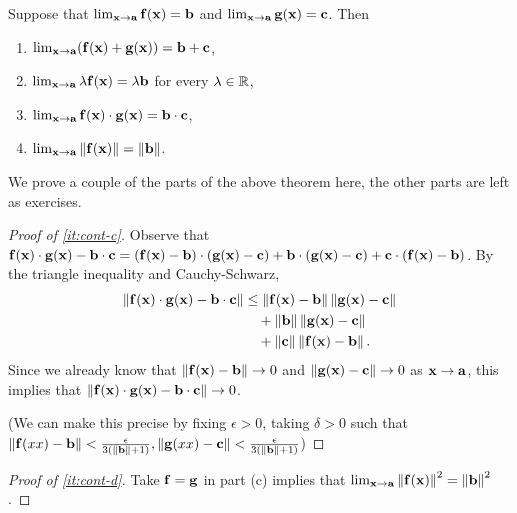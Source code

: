 \begin{theorem}
    Suppose that \(  \lim_{\mathbf{x} \to \mathbf{a}}\mathbf{f}(\mathbf{x}) = \mathbf{b}\) and \(  \lim_{\mathbf{x} \to \mathbf{a}}\mathbf{g}(\mathbf{x}) = \mathbf{c}\).
    Then
    \begin{enumerate}
        \item \(  \lim_{\mathbf{x} \to \mathbf{a}}(\mathbf{f}(\mathbf{x})+\mathbf{g}(\mathbf{x})) = \mathbf{b}+\mathbf{c}\), \label{it:cont-a}
        \item \(  \lim_{\mathbf{x} \to \mathbf{a}} \lambda \mathbf{f}(\mathbf{x}) = \lambda \mathbf{b}\) for every \(\lambda \in \mathbb{R}\), \label{it:cont-b}
        \item \(  \lim_{\mathbf{x} \to \mathbf{a}}\mathbf{f}(\mathbf{x})\cdot \mathbf{g}(\mathbf{x}) = \mathbf{b}\cdot \mathbf{c}\), \label{it:cont-c}
        \item \(  \lim_{\mathbf{x} \to \mathbf{a}} \left\|\mathbf{f}(\mathbf{x})\right\| = \left\|\mathbf{b}\right\|\). \label{it:cont-d}
    \end{enumerate}
\end{theorem}

We prove a couple of the parts of the above theorem here, the other parts are left as exercises.

\begin{proof}[Proof of \ref{it:cont-c}]
    Observe that  \(
    \mathbf{f}(\mathbf{x})\cdot\mathbf{g}(\mathbf{x}) - \mathbf{b}\cdot \mathbf{c}
    = (\mathbf{f}(\mathbf{x})-\mathbf{b})\cdot(\mathbf{g}(\mathbf{x})-\mathbf{c}) + \mathbf{b}\cdot(\mathbf{g}(\mathbf{x})-\mathbf{c}) + \mathbf{c}\cdot(\mathbf{f}(\mathbf{x})-\mathbf{b})
    \).
    By the triangle inequality and Cauchy-Schwarz,
    \[
        \begin{aligned}
            \left\|\mathbf{f}(\mathbf{x})\cdot\mathbf{g}(\mathbf{x}) - \mathbf{b}\cdot \mathbf{c} \right\|
             & \leq \left\|\mathbf{f}(\mathbf{x})-\mathbf{b}\right\| \left\|\mathbf{g}(\mathbf{x})-\mathbf{c}\right\| \\
             & \quad + \left\|\mathbf{b}\right\|\left\|\mathbf{g}(\mathbf{x})-\mathbf{c}\right\|        \\
             & \quad + \left\|\mathbf{c}\right\| \left\|\mathbf{f}(\mathbf{x})-\mathbf{b}\right\|.
        \end{aligned}
    \]
    Since we already know that \(\left\|\mathbf{f}(\mathbf{x})-\mathbf{b}\right\| \to 0\) and \(\left\|\mathbf{g}(\mathbf{x})-\mathbf{c}\right\| \to 0\) as \(\mathbf{x} \to \mathbf{a}\), this implies that \(\left\|\mathbf{f}(\mathbf{x})\cdot\mathbf{g}(\mathbf{x}) - \mathbf{b}\cdot \mathbf{c} \right\|\to 0\).
    
    (We can make this precise by fixing $\epsilon > 0$, taking $\delta > 0$ such that
    $\left\|\mathbf{f}(xx) - \mathbf{b}\right\| < \frac{\epsilon}{3(\left\|\mathbf{b}\right\|+1)}, \left\|\mathbf{g}(xx) - \mathbf{c}\right\| < \frac{\epsilon}{3(\left\|\mathbf{b}\right\|+1)}$)
\end{proof}

\begin{proof}[Proof of \ref{it:cont-d}]
    Take \(\mathbf{f} = \mathbf{g}\) in part (c) implies that \(   \lim_{\mathbf{x} \to \mathbf{a}} \left\|\mathbf{f}(\mathbf{x})\right\|^2 = \left\|\mathbf{b}\right\|^2\).
\end{proof}



